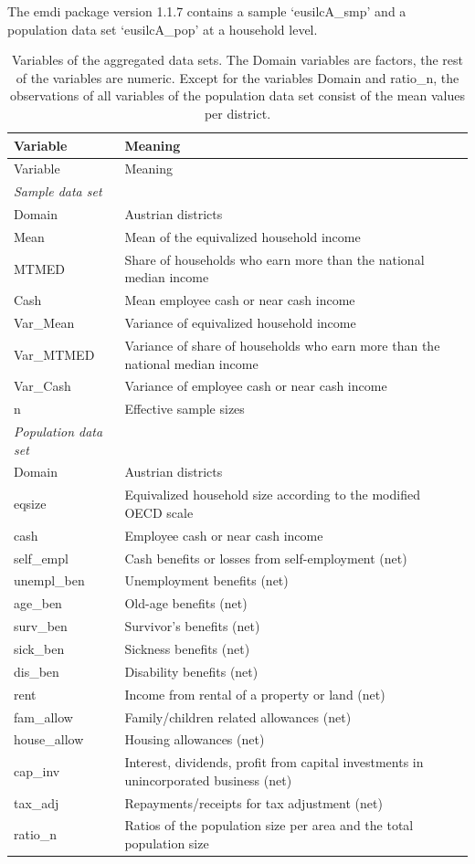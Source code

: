 The emdi package version 1.1.7 contains a sample
`{eusilcA\_smp}' and a population data set
`{eusilcA\_pop}' at a household level.

\hypertarget{tab:variables}{}
\begin{longtable}[]{@{}ll@{}}
\caption{Variables of the aggregated data sets. The Domain variables are
factors, the rest of the variables are numeric. Except for the
variables Domain and ratio\_n, the observations of all variables of the
population data set consist of the mean values per district.}\tabularnewline
\toprule\noalign{}
Variable & Meaning \\
\midrule\noalign{}
\endfirsthead
\toprule\noalign{}
Variable & Meaning \\
\midrule\noalign{}
\endhead
\bottomrule\noalign{}
\endlastfoot
\emph{Sample data set} & \\
Domain & Austrian districts \\
Mean & Mean of the equivalized household income \\
MTMED & Share of households who earn more than the national median income \\
Cash & Mean employee cash or near cash income \\
Var\_Mean & Variance of equivalized household income \\
Var\_MTMED & Variance of share of households who earn more than the national median income \\
Var\_Cash & Variance of employee cash or near cash income \\
n & Effective sample sizes \\
\emph{Population data set} & \\
Domain & Austrian districts \\
eqsize & Equivalized household size according to the modified OECD scale \\
cash & Employee cash or near cash income \\
self\_empl & Cash benefits or losses from self-employment (net) \\
unempl\_ben & Unemployment benefits (net) \\
age\_ben & Old-age benefits (net) \\
surv\_ben & Survivor's benefits (net) \\
sick\_ben & Sickness benefits (net) \\
dis\_ben & Disability benefits (net) \\
rent & Income from rental of a property or land (net) \\
fam\_allow & Family/children related allowances (net) \\
house\_allow & Housing allowances (net) \\
cap\_inv & Interest, dividends, profit from capital investments in unincorporated business (net) \\
tax\_adj & Repayments/receipts for tax adjustment (net) \\
ratio\_n & Ratios of the population size per area and the total population size \\
\end{longtable}

